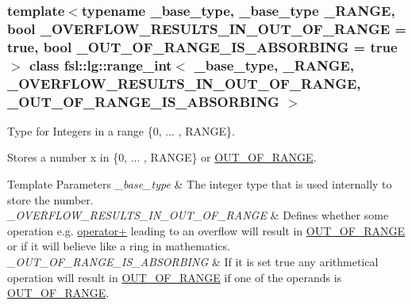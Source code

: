 \subsubsection*{template$<$typename \+\_\+base\+\_\+type, \+\_\+base\+\_\+type \+\_\+\+R\+A\+N\+GE, bool \+\_\+\+O\+V\+E\+R\+F\+L\+O\+W\+\_\+\+R\+E\+S\+U\+L\+T\+S\+\_\+\+I\+N\+\_\+\+O\+U\+T\+\_\+\+O\+F\+\_\+\+R\+A\+N\+GE = true, bool \+\_\+\+O\+U\+T\+\_\+\+O\+F\+\_\+\+R\+A\+N\+G\+E\+\_\+\+I\+S\+\_\+\+A\+B\+S\+O\+R\+B\+I\+NG = true$>$\newline
class fsl\+::lg\+::range\+\_\+int$<$ \+\_\+base\+\_\+type, \+\_\+\+R\+A\+N\+G\+E, \+\_\+\+O\+V\+E\+R\+F\+L\+O\+W\+\_\+\+R\+E\+S\+U\+L\+T\+S\+\_\+\+I\+N\+\_\+\+O\+U\+T\+\_\+\+O\+F\+\_\+\+R\+A\+N\+G\+E, \+\_\+\+O\+U\+T\+\_\+\+O\+F\+\_\+\+R\+A\+N\+G\+E\+\_\+\+I\+S\+\_\+\+A\+B\+S\+O\+R\+B\+I\+N\+G $>$}

Type for Integers in a range \{0, ... , R\+A\+N\+GE\}. 

Stores a number x in \{0, ... , R\+A\+N\+GE\} or \mbox{\hyperlink{classfsl_1_1lg_1_1range__int_acbcdf600daa56d701bdf215ccfb43ce7}{O\+U\+T\+\_\+\+O\+F\+\_\+\+R\+A\+N\+GE}}. 
\begin{DoxyTemplParams}{Template Parameters}
{\em \+\_\+base\+\_\+type} & The integer type that is used internally to store the number. \\
\hline
{\em \+\_\+\+O\+V\+E\+R\+F\+L\+O\+W\+\_\+\+R\+E\+S\+U\+L\+T\+S\+\_\+\+I\+N\+\_\+\+O\+U\+T\+\_\+\+O\+F\+\_\+\+R\+A\+N\+GE} & Defines whether some operation e.\+g. \mbox{\hyperlink{classfsl_1_1lg_1_1range__int_a61dfb1dc667dbb7afefa10680749c8e4}{operator+}} leading to an overflow will result in \mbox{\hyperlink{classfsl_1_1lg_1_1range__int_acbcdf600daa56d701bdf215ccfb43ce7}{O\+U\+T\+\_\+\+O\+F\+\_\+\+R\+A\+N\+GE}} or if it will believe like a ring in mathematics. \\
\hline
{\em \+\_\+\+O\+U\+T\+\_\+\+O\+F\+\_\+\+R\+A\+N\+G\+E\+\_\+\+I\+S\+\_\+\+A\+B\+S\+O\+R\+B\+I\+NG} & If it is set true any arithmetical operation will result in \mbox{\hyperlink{classfsl_1_1lg_1_1range__int_acbcdf600daa56d701bdf215ccfb43ce7}{O\+U\+T\+\_\+\+O\+F\+\_\+\+R\+A\+N\+GE}} if one of the operands is \mbox{\hyperlink{classfsl_1_1lg_1_1range__int_acbcdf600daa56d701bdf215ccfb43ce7}{O\+U\+T\+\_\+\+O\+F\+\_\+\+R\+A\+N\+GE}}. \\
\hline
\end{DoxyTemplParams}



